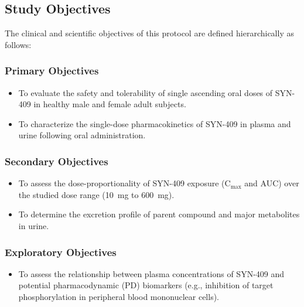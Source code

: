 \subsection{Study Objectives}

The clinical and scientific objectives of this protocol are defined hierarchically as follows:

\subsubsection{Primary Objectives}
\begin{itemize}
  \item To evaluate the safety and tolerability of single ascending oral doses of SYN-409 in healthy male and female adult subjects.
  \item To characterize the single-dose pharmacokinetics of SYN-409 in plasma and urine following oral administration.
\end{itemize}

\subsubsection{Secondary Objectives}
\begin{itemize}
  \item To assess the dose-proportionality of SYN-409 exposure (C$_{\max}$ and AUC) over the studied dose range (10~mg to 600~mg).
  \item To determine the excretion profile of parent compound and major metabolites in urine.
\end{itemize}

\subsubsection{Exploratory Objectives}
\begin{itemize}
  \item To assess the relationship between plasma concentrations of SYN-409 and potential pharmacodynamic (PD) biomarkers (e.g., inhibition of target phosphorylation in peripheral blood mononuclear cells).
\end{itemize}
